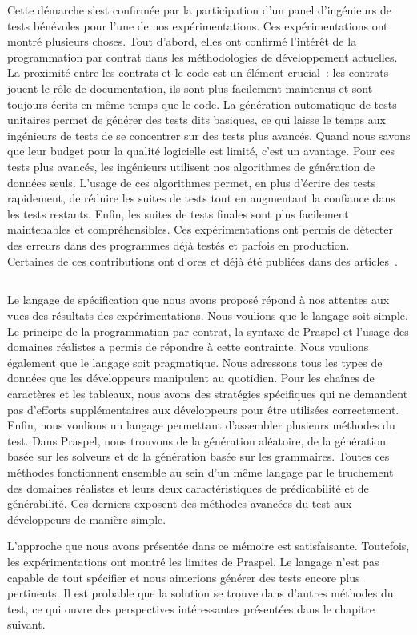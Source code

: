 Cette démarche s'est confirmée par la participation d'un panel d'ingénieurs de
tests bénévoles pour l'une de nos expérimentations. Ces expérimentations ont
montré plusieurs choses. Tout d'abord, elles ont confirmé l'intérêt de la
programmation par contrat dans les méthodologies de développement actuelles. La
proximité entre les contrats et le code est un élément crucial~: les contrats
jouent le rôle de documentation, ils sont plus facilement maintenus et sont
toujours écrits en même temps que le code. La génération automatique de tests
unitaires permet de générer des tests dits basiques, ce qui laisse le temps aux
ingénieurs de tests de se concentrer sur des tests plus avancés. Quand nous
savons que leur budget pour la qualité logicielle est limité, c'est un avantage.
Pour ces tests plus avancés, les ingénieurs utilisent nos algorithmes de
génération de données seuls. L'usage de ces algorithmes permet, en plus d'écrire
des tests rapidement, de réduire les suites de tests tout en augmentant la
confiance dans les tests restants. Enfin, les suites de tests finales sont plus
facilement maintenables et compréhensibles. Ces expérimentations ont permis de
détecter des erreurs dans des programmes déjà testés et parfois en production.
\\

Certaines de ces contributions ont d'ores et déjà été publiées dans des
articles~.

\subsection{}
\label{subsection:conclusions:summa}

Le langage de spécification que nous avons proposé répond à nos attentes aux
vues des résultats des expérimentations. Nous voulions que le langage soit
simple. Le principe de la programmation par contrat, la syntaxe de Praspel et
l'usage des domaines réalistes a permis de répondre à cette contrainte. Nous
voulions également que le langage soit pragmatique. Nous adressons tous les
types de données que les développeurs manipulent au quotidien. Pour les chaînes
de caractères et les tableaux, nous avons des stratégies spécifiques qui ne
demandent pas d'efforts supplémentaires aux développeurs pour être utilisées
correctement. Enfin, nous voulions un langage permettant d'assembler plusieurs
méthodes du test. Dans Praspel, nous trouvons de la génération aléatoire, de la
génération basée sur les solveurs et de la génération basée sur les grammaires.
Toutes ces méthodes fonctionnent ensemble au sein d'un même langage par le
truchement des domaines réalistes et leurs deux caractéristiques de
prédicabilité et de générabilité.  Ces derniers exposent des méthodes avancées
du test aux développeurs de manière simple.

L'approche que nous avons présentée dans ce mémoire est satisfaisante.
Toutefois, les expérimentations ont montré les limites de Praspel. Le langage
n'est pas capable de tout spécifier et nous aimerions générer des tests encore
plus pertinents. Il est probable que la solution se trouve dans d'autres
méthodes du test, ce qui ouvre des perspectives intéressantes présentées dans le
chapitre suivant.
